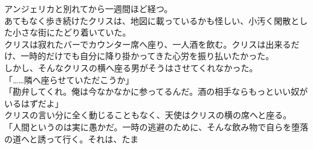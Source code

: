 \documentclass[b5j,10pt,openany]{jsbook}
\begin{document}
アンジェリカと別れてから一週間ほど経つ。\\あてもなく歩き続けたクリスは、地図に載っているかも怪しい、小汚く閑散とした小さな街にたどり着いていた。\\クリスは寂れたバーでカウンター席へ座り、一人酒を飲む。クリスは出来るだけ、一時的だけでも自分に降り掛かってきた心労を振り払いたかった。\\しかし、そんなクリスの横へ座る男がそうはさせてくれなかった。\\「\ldots{}\ldots{}隣へ座らせていただこうか」\\「勘弁してくれ。俺は今なかなかに参ってるんだ。酒の相手ならもっといい奴がいるはずだよ」\\クリスの言い分に全く動じることもなく、天使はクリスの横の席へと座る。\\「人間というのは実に愚かだ。一時の逃避のために、そんな飲み物で自らを堕落の道へと誘って行く。それは、たま
\end{document}
